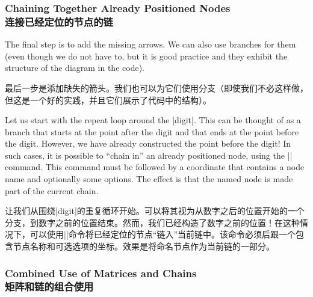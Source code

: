 \subsubsection{Chaining Together Already Positioned Nodes\\连接已经定位的节点的链}

The final step is to add the missing arrows. We can also use branches
for them (even though we do not have to, but it is good practice and
they exhibit the structure of the diagram in the code).

最后一步是添加缺失的箭头。我们也可以为它们使用分支（即使我们不必这样做，但这是一个好的实践，并且它们展示了代码中的结构）。

Let us start with the repeat loop around the |digit|. This can be
thought of as a branch that starts at the point after the digit and
that ends at the point before the digit. However, we have already
constructed the point before the digit! In such cases, it is possible
to ``chain in'' an already positioned node, using the |\chainin|
command. This command must be followed by a coordinate that contains a
node name and optionally some options. The effect is that the named
node is made part of the current chain.

让我们从围绕|digit|的重复循环开始。可以将其视为从数字之后的位置开始的一个分支，到数字之前的位置结束。然而，我们已经构造了数字之前的位置！在这种情况下，可以使用|\chainin|命令将已经定位的节点“链入”当前链中。该命令必须后跟一个包含节点名称和可选选项的坐标。效果是将命名节点作为当前链的一部分。

\begin{codeexample}[pre={\tikzset{node distance=5mm and 2mm,
                    every node/.style={on chain},
                    terminal/.append style={join=by ->},
                    point/.style={join=by -,circle,fill=red,minimum size=2pt,inner sep=0pt}}}]
\end{codeexample}


\subsubsection{Combined Use of Matrices and Chains\\矩阵和链的组合使用}

